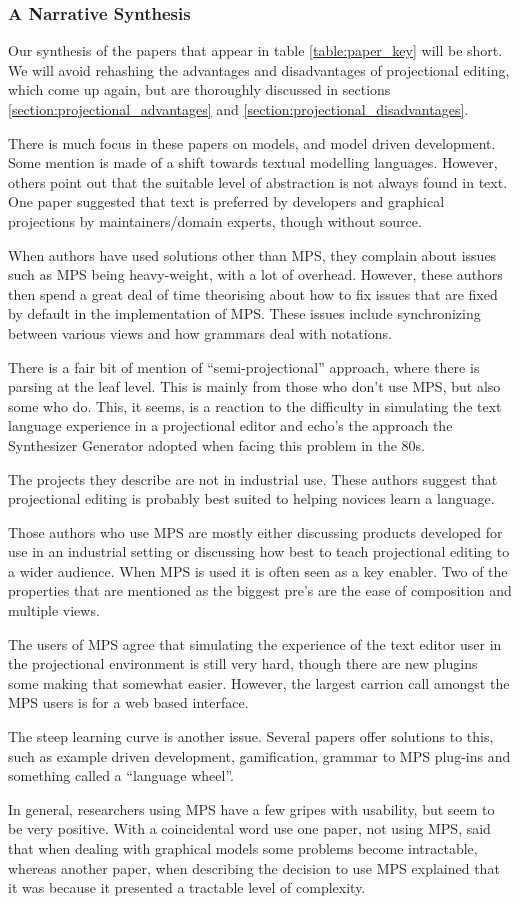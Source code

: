 \subsubsection{A Narrative Synthesis}
Our synthesis of the papers that appear in table \ref{table:paper_key} will be short.
We will avoid rehashing the advantages and disadvantages of projectional editing, which come up again, but are thoroughly discussed in sections \ref{section:projectional_advantages} and \ref{section:projectional_disadvantages}.

There is much focus in these papers on models, and model driven development.
Some mention is made of a shift towards textual modelling languages.
However, others point out that the suitable level of abstraction is not always found in text.
One paper suggested that text is preferred by developers and graphical projections by maintainers/domain experts, though without source.

When authors have used solutions other than MPS, they complain about issues such as MPS being heavy-weight, with a lot of overhead.
However, these authors then spend a great deal of time theorising about how to fix issues that are fixed by default in the implementation of MPS.
These issues include synchronizing between various views and how grammars deal with notations.

There is a fair bit of mention of ``semi-projectional'' approach, where there is parsing at the leaf level.
This is mainly from those who don't use MPS, but also some who do.
This, it seems, is a reaction to the difficulty in simulating the text language experience in a projectional editor and echo's the approach the Synthesizer Generator adopted when facing this problem in the 80s.

The projects they describe are not in industrial use.
These authors suggest that projectional editing is probably best suited to helping novices learn a language. 

Those authors who use MPS are mostly either discussing products developed for use in an industrial setting or discussing how best to teach projectional editing to a wider audience.
When MPS is used it is often seen as a key enabler.
Two of the properties that are mentioned as the biggest pre's are the ease of composition and multiple views.

The users of MPS agree that simulating the experience of the text editor user in the projectional environment is still very hard, though there are new plugins some making that somewhat easier.
However, the largest carrion call amongst the MPS users is for a web based interface.

The steep learning curve is another issue.
Several papers offer solutions to this, such as example driven development, gamification, grammar to MPS plug-ins and something called a ``language wheel''.

In general, researchers using MPS have a few gripes with usability, but seem to be very positive.
With a coincidental word use one paper, not using MPS, said that when dealing with graphical models some problems become intractable, whereas another paper, when describing the decision to use MPS explained that it was because it presented a tractable level of complexity. 

